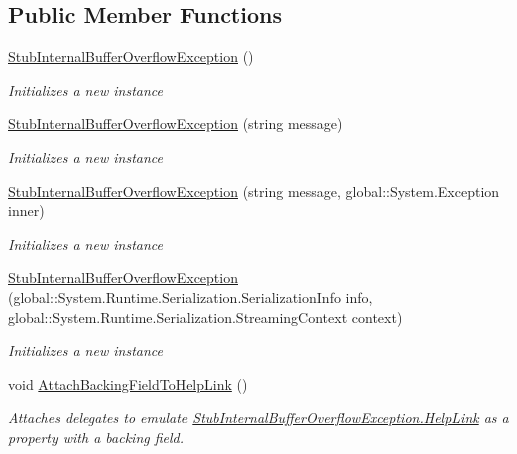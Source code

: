\subsection*{Public Member Functions}
\begin{DoxyCompactItemize}
\item 
\hyperlink{class_system_1_1_i_o_1_1_fakes_1_1_stub_internal_buffer_overflow_exception_a116db425eb74a776d050d1076ecf01e0}{Stub\-Internal\-Buffer\-Overflow\-Exception} ()
\begin{DoxyCompactList}\small\item\em Initializes a new instance\end{DoxyCompactList}\item 
\hyperlink{class_system_1_1_i_o_1_1_fakes_1_1_stub_internal_buffer_overflow_exception_aba7697d8536078e7bbad81d343b9878e}{Stub\-Internal\-Buffer\-Overflow\-Exception} (string message)
\begin{DoxyCompactList}\small\item\em Initializes a new instance\end{DoxyCompactList}\item 
\hyperlink{class_system_1_1_i_o_1_1_fakes_1_1_stub_internal_buffer_overflow_exception_ade556cbbd95ea7e4be9f18a4b35b4188}{Stub\-Internal\-Buffer\-Overflow\-Exception} (string message, global\-::\-System.\-Exception inner)
\begin{DoxyCompactList}\small\item\em Initializes a new instance\end{DoxyCompactList}\item 
\hyperlink{class_system_1_1_i_o_1_1_fakes_1_1_stub_internal_buffer_overflow_exception_a578001f457ba0f7a73be9e258d10882c}{Stub\-Internal\-Buffer\-Overflow\-Exception} (global\-::\-System.\-Runtime.\-Serialization.\-Serialization\-Info info, global\-::\-System.\-Runtime.\-Serialization.\-Streaming\-Context context)
\begin{DoxyCompactList}\small\item\em Initializes a new instance\end{DoxyCompactList}\item 
void \hyperlink{class_system_1_1_i_o_1_1_fakes_1_1_stub_internal_buffer_overflow_exception_a25f6c65a7bf2799a247d1b1e44b371a6}{Attach\-Backing\-Field\-To\-Help\-Link} ()
\begin{DoxyCompactList}\small\item\em Attaches delegates to emulate \hyperlink{class_system_1_1_i_o_1_1_fakes_1_1_stub_internal_buffer_overflow_exception_ab6beaf7ad0021ad2fcfb5d1d21284c8c}{Stub\-Internal\-Buffer\-Overflow\-Exception.\-Help\-Link} as a property with a backing field.\end{DoxyCompactList}\item 

\end{DoxyCompactItemize}

